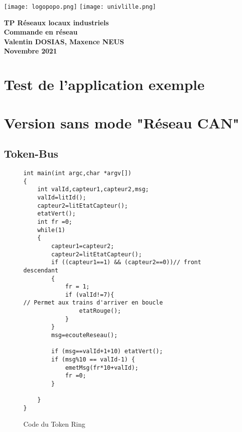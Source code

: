 \documentclass[oneside,a4paper,11pt]{article}
\begin{document}
	\begin{titlepage}
		\texttt{[image: logopopo.png]}
		\hspace*{\fill}
		\texttt{[image: univlille.png]}
		
		\begin{center}
			\vspace{1cm}
			\textbf{TP Réseaux locaux industriels}\\
			\textbf{Commande en réseau}\\
			\vspace{1cm}
			\textbf{Valentin DOSIAS, Maxence NEUS}\\
			\vspace{3cm}
			\vspace{\fill}
			\textbf{Novembre 2021}\\
		\end{center}
	\end{titlepage}

	\tableofcontents
	\newpage

	\section{Test de l'application exemple}
	
	\section{Version sans mode "Réseau CAN"}
	
		\subsection{Token-Bus}
		
		\begin{figure}[h]
			\centering
			\begin{lstlisting}
int main(int argc,char *argv[])
{
	int valId,capteur1,capteur2,msg;
	valId=litId();
	capteur2=litEtatCapteur();
	etatVert();
	int fr =0;
	while(1)
	{
		capteur1=capteur2;
		capteur2=litEtatCapteur();
		if ((capteur1==1) && (capteur2==0))// front descendant
		{
			fr = 1;
			if (valId!=7){
// Permet aux trains d'arriver en boucle
				etatRouge();
			}
		}
		msg=ecouteReseau();
		
		if (msg==valId+1+10) etatVert();
		if (msg%10 == valId-1) {
			emetMsg(fr*10+valId);
			fr =0;
		}
		
	}
}
			\end{lstlisting}
		\caption{Code du Token Ring}
		\end{figure}
		
\end{document}
